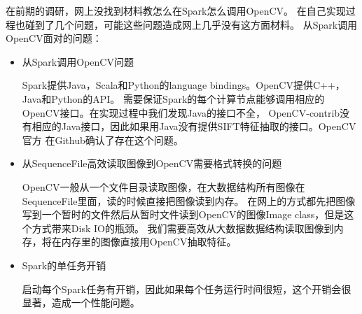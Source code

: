 在前期的调研，网上没找到材料教怎么在Spark怎么调用OpenCV。
在自己实现过程也碰到了几个问题，可能这些问题造成网上几乎没有这方面材料。
从Spark调用OpenCV面对的问题：
\begin{itemize}
  \item 从Spark调用OpenCV问题

        Spark提供Java，Scala和Python的language bindings。OpenCV提供C++，Java和Python的API。
        需要保证Spark的每个计算节点能够调用相应的OpenCV接口。在实现过程中我们发现Java的接口不全，
        OpenCV-contrib没有相应的Java接口，因此如果用Java没有提供SIFT特征抽取的接口。OpenCV官方
        在Github确认了存在这个问题。
  \item 从SequenceFile高效读取图像到OpenCV需要格式转换的问题

        OpenCV一般从一个文件目录读取图像，在大数据结构所有图像在SequenceFile里面，读的时候直接把图像读到内存。
        在网上的方式都先把图像写到一个暂时的文件然后从暂时文件读到OpenCV的图像Image class，但是这个方式带来Disk IO的瓶颈。
        我们需要高效从大数据数据结构读取图像到内存，将在内存里的图像直接用OpenCV抽取特征。
  \item Spark的单任务开销

        启动每个Spark任务有开销，因此如果每个任务运行时间很短，这个开销会很显著，造成一个性能问题。
\end{itemize}

